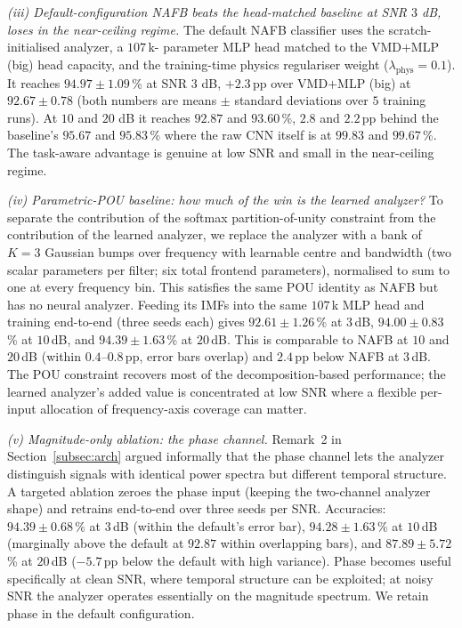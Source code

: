 \documentclass[journal]{IEEEtran}
\theoremstyle{remark}
\begin{document}
\emph{(iii) Default-configuration NAFB beats the head-matched
baseline at SNR $3$ dB, loses in the near-ceiling regime.} The default
NAFB classifier uses the scratch-initialised analyzer, a $107$\,k-
parameter MLP head matched to the VMD$+$MLP (big) head capacity, and
the training-time physics regulariser weight
($\lambda_{\text{phys}} = 0.1$). It reaches $94.97 \pm 1.09$\,\%
at SNR $3$ dB, $+2.3$\,pp over VMD$+$MLP (big) at $92.67 \pm 0.78$
(both numbers are means $\pm$ standard deviations over $5$ training
runs). At $10$ and $20$ dB it reaches $92.87$ and $93.60$\,\%, $2.8$
and $2.2$\,pp behind the baseline's $95.67$ and $95.83$\,\% where the
raw CNN itself is at $99.83$ and $99.67$\,\%. The task-aware
advantage is genuine at low SNR and small in the near-ceiling regime.

\emph{(iv) Parametric-POU baseline: how much of the win is the
learned analyzer?} To separate the contribution of the softmax
partition-of-unity constraint from the contribution of the learned
analyzer, we replace the analyzer with a bank of $K = 3$ Gaussian
bumps over frequency with learnable centre and bandwidth (two scalar
parameters per filter; six total frontend parameters), normalised to
sum to one at every frequency bin. This satisfies the same POU
identity as NAFB but has no neural analyzer. Feeding its IMFs into
the same $107$\,k MLP head and training end-to-end (three seeds each)
gives $92.61 \pm 1.26$\,\% at $3$\,dB, $94.00 \pm 0.83$\,\% at
$10$\,dB, and $94.39 \pm 1.63$\,\% at $20$\,dB. This is comparable
to NAFB at $10$ and $20$\,dB (within $0.4$--$0.8$\,pp, error bars
overlap) and $2.4$\,pp below NAFB at $3$\,dB. The POU constraint
recovers most of the decomposition-based performance; the learned
analyzer's added value is concentrated at low SNR where a flexible
per-input allocation of frequency-axis coverage can matter.

\emph{(v) Magnitude-only ablation: the phase channel.} Remark~2 in
Section~\ref{subsec:arch} argued informally that the phase channel
lets the analyzer distinguish signals with identical power spectra
but different temporal structure. A targeted ablation zeroes the
phase input (keeping the two-channel analyzer shape) and retrains
end-to-end over three seeds per SNR. Accuracies: $94.39 \pm 0.68$\,\%
at $3$\,dB (within the default's error bar), $94.28 \pm 1.63$\,\% at
$10$\,dB (marginally above the default at $92.87$ within overlapping
bars), and $87.89 \pm 5.72$\,\% at $20$\,dB ($-5.7$\,pp below the
default with high variance). Phase becomes useful specifically at
clean SNR, where temporal structure can be exploited; at noisy SNR
the analyzer operates essentially on the magnitude spectrum. We
retain phase in the default configuration.
\end{document}
